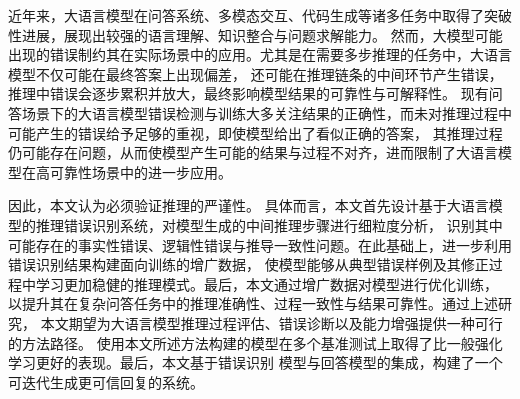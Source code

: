 \begin{cabstract}
近年来，大语言模型在问答系统、多模态交互、代码生成等诸多任务中取得了突破性进展，展现出较强的语言理解、知识整合与问题求解能力。
然而，大模型可能出现的错误制约其在实际场景中的应用。尤其是在需要多步推理的任务中，大语言模型不仅可能在最终答案上出现偏差，
还可能在推理链条的中间环节产生错误，推理中错误会逐步累积并放大，最终影响模型结果的可靠性与可解释性。
现有问答场景下的大语言模型错误检测与训练大多关注结果的正确性，而未对推理过程中可能产生的错误给予足够的重视，即使模型给出了看似正确的答案，
其推理过程仍可能存在问题，从而使模型产生可能的结果与过程不对齐，进而限制了大语言模型在高可靠性场景中的进一步应用。

因此，本文认为必须验证推理的严谨性。
具体而言，本文首先设计基于大语言模型的推理错误识别系统，对模型生成的中间推理步骤进行细粒度分析，
识别其中可能存在的事实性错误、逻辑性错误与推导一致性问题。在此基础上，进一步利用错误识别结果构建面向训练的增广数据，
使模型能够从典型错误样例及其修正过程中学习更加稳健的推理模式。最后，本文通过增广数据对模型进行优化训练，
以提升其在复杂问答任务中的推理准确性、过程一致性与结果可靠性。通过上述研究，
本文期望为大语言模型推理过程评估、错误诊断以及能力增强提供一种可行的方法路径。
使用本文所述方法构建的模型在多个基准测试上取得了比一般强化学习更好的表现。最后，本文基于错误识别
模型与回答模型的集成，构建了一个可迭代生成更可信回复的系统。

\end{cabstract}


